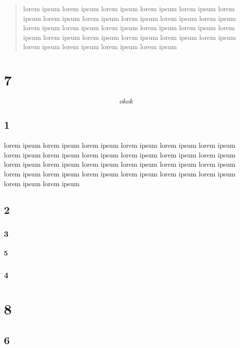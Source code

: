 \documentclass{book}
\begin{document}
\begin{abstract}
    lorem ipsum lorem ipsum lorem ipsum lorem ipsum lorem ipsum lorem ipsum lorem ipsum lorem ipsum lorem ipsum lorem ipsum lorem ipsum lorem ipsum lorem ipsum lorem ipsum lorem ipsum lorem ipsum lorem ipsum lorem ipsum lorem ipsum lorem ipsum lorem ipsum lorem ipsum lorem ipsum lorem ipsum lorem ipsum lorem ipsum 
\end{abstract}

\chapter{7}
\label{cha:7}
\begin{equation}
    \label{eq:1}
    okok
\end{equation}

\section{1}
\label{sec:1}

lorem ipsum lorem ipsum lorem ipsum lorem ipsum lorem ipsum lorem ipsum lorem ipsum lorem ipsum lorem ipsum lorem ipsum lorem ipsum lorem ipsum lorem ipsum lorem ipsum lorem ipsum lorem ipsum lorem ipsum lorem ipsum lorem ipsum lorem ipsum lorem ipsum lorem ipsum lorem ipsum lorem ipsum lorem ipsum lorem ipsum 

\section{2}
\label{sec:2}

\subsection{3}
\label{sec:3}

\subsubsection{5}
\label{sec:5}

\subsection{4}
\label{sec:4}

\appendix

\chapter{8}
\label{cha:8}

\section{6}
\label{sec:6}
\end{document}

